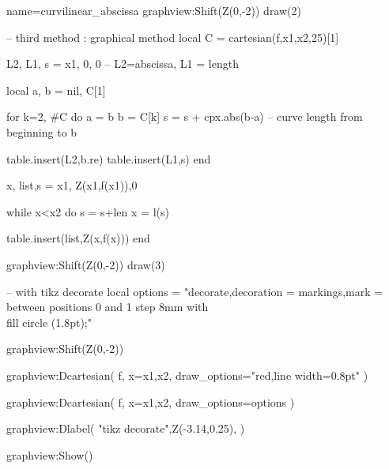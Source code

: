 \documentclass{standalone}
\begin{document}
\begin{luadraw}{name=curvilinear_abscissa}
graphview:Shift(Z(0,-2))
draw(2)

-- third method : graphical method
local C = cartesian(f,x1,x2,25)[1]

L2, L1, s = {x1}, {0}, 0 -- L2=abscissa, L1 = length

local a, b = nil, C[1]

for k=2, #C do
  a = b
  b = C[k]
  s = s + cpx.abs(b-a) -- curve length from beginning to b

  table.insert(L2,b.re)
  table.insert(L1,s)
end

x, list,s = x1, {Z(x1,f(x1))},0

while x<x2 do
  s = s+len
  x = l(s)

  table.insert(list,Z(x,f(x)))
end

graphview:Shift(Z(0,-2))
draw(3)

-- with tikz decorate
local options = "decorate,decoration = {markings,mark = between positions 0 and 1 step 8mm with {\\fill circle (1.8pt);}}"

graphview:Shift(Z(0,-2))

graphview:Dcartesian(
  f,
  {
    x={x1,x2},
    draw_options="red,line width=0.8pt"
  }
)

graphview:Dcartesian(
  f,
  {
    x={x1,x2},
    draw_options=options
  }
)

graphview:Dlabel(
  "tikz decorate",Z(-3.14,0.25),{}
)

graphview:Show()
\end{luadraw}
\end{document}
